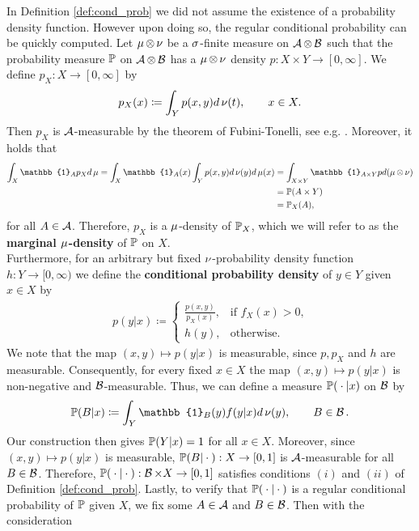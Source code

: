 In Definition \ref{def:cond_prob} we did not assume the existence of a probability density function. However upon doing so, the regular conditional probability can be quickly computed. Let $\operatorname{\mu} \otimes \operatorname{\nu}$ be a $\operatorname{\sigma}$-finite measure on $\operatorname{\mathcal{A}} \otimes \operatorname{\mathcal{B}}$ such that the probability measure $\operatorname{\mathbb{P}}$ on $\operatorname{\mathcal{A}} \otimes \operatorname{\mathcal{B}}$ has a $\operatorname{\mu} \otimes \operatorname{\nu}$ density $p: X \times Y \to  [0, \infty]$. We define $p_X: X \to [0, \infty]$ by
\begin{align*}
p_X(x) \coloneqq \int_{Y} p(x, y) d\operatorname{\nu}(t),\qquad x\in X.
\end{align*}
Then $p_X$ is $\operatorname{\mathcal{A}}$-measurable by the theorem of Fubini-Tonelli, see e.g. \cite[Theorem~14.16]{klenke2013probability}. Moreover, it holds that
\begin{align*}
\int_{X}\mathbb{1}_Ap_Xd\m = \int_X \mathbb{1}_A(x)\int_Yp(x,y)d\n(y)d\m(x) &= \int_{X \times Y}\mathbb{1}_{A\times Y} p d (\m \otimes \n)\\
&= \prob(A\times Y)\\
&= \prob_X(A),
\end{align*}
for all $A\in\operatorname{\mathcal{A}}$. Therefore, $p_X$ is a $\operatorname{\mu}$-density of $\operatorname{\mathbb{P}}_X$, which we will refer to as the \textbf{marginal $\operatorname{\mu}$-density} of $\operatorname{\mathbb{P}}$ on $X$.\\
Furthermore, for an arbitrary but fixed $\operatorname{\nu}$-probability density function $h:Y\to [0,\infty)$ we define the \textbf{conditional probability density} of $y\in Y$ given $x\in X$ by
\begin{align*}
p(y|x) \coloneqq \begin{cases}
\frac{p(x, y)}{p_X(x)}, 	&\text{if $f_X(x)>0$,}\\
h(y), 						&\text{otherwise}.
\end{cases}
\end{align*}
We note that the map $(x,y) \mapsto p(y|x)$ is measurable, since $p, p_X$ and $h$ are measurable. Consequently, for every fixed $x\in X$ the map $(x,y) \mapsto p(y|x)$ is non-negative and $\operatorname{\mathcal{B}}$-measurable. Thus, we can define a measure $\operatorname{\mathbb{P}}({}\cdot{}|x)$ on $\operatorname{\mathcal{B}}$ by
\begin{align*}
\prob(B|x) \coloneqq \int_{Y} \mathbb{1}_B(y) f(y|x)d\n(y), \qquad B\in\B.
\end{align*}
Our construction then gives $\operatorname{\mathbb{P}}(Y|x) = 1$ for all $x\in X$. Moreover, since $(x,y) \mapsto p(y|x)$ is measurable, $\operatorname{\mathbb{P}}(B|{}\cdot{}):X\to [0, 1]$ is $\operatorname{\mathcal{A}}$-measurable for all $B\in\operatorname{\mathcal{B}}$. Therefore, $\operatorname{\mathbb{P}}({}\cdot{} |{}\cdot{}):\operatorname{\mathcal{B}}\times X \to [0, 1]$ satisfies conditions $(i)$ and $(ii)$ of Definition \ref{def:cond_prob}. Lastly, to verify that $\operatorname{\mathbb{P}}({}\cdot{} |{}\cdot{})$ is a regular conditional probability of $\operatorname{\mathbb{P}}$ given $X$, we fix some $A\in\operatorname{\mathcal{A}}$ and $B\in\operatorname{\mathcal{B}}$. Then with the consideration
